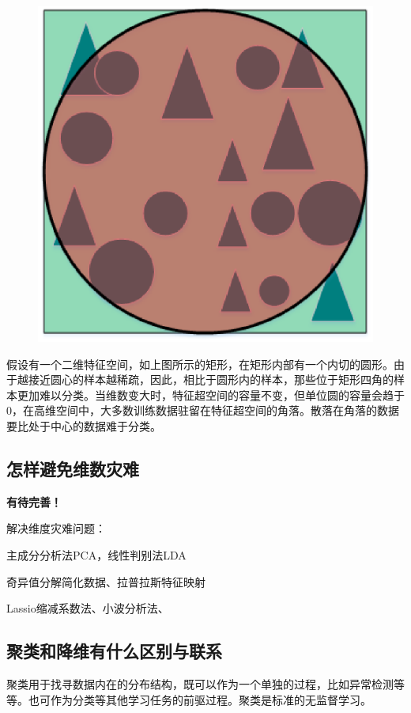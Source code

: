  \begin{figure}[h]
   \centering
   \includegraphics[width=.5\textwidth]{imgs/2.21.1.7.eps}
 \end{figure}

假设有一个二维特征空间，如上图所示的矩形，在矩形内部有一个内切的圆形。由于越接近圆心的样本越稀疏，因此，相比于圆形内的样本，那些位于矩形四角的样本更加难以分类。当维数变大时，特征超空间的容量不变，但单位圆的容量会趋于0，在高维空间中，大多数训练数据驻留在特征超空间的角落。散落在角落的数据要比处于中心的数据难于分类。

\subsection{怎样避免维数灾难}

{\bf 有待完善！}

解决维度灾难问题：

主成分分析法PCA，线性判别法LDA

奇异值分解简化数据、拉普拉斯特征映射

Lassio缩减系数法、小波分析法、

\subsection{聚类和降维有什么区别与联系}

聚类用于找寻数据内在的分布结构，既可以作为一个单独的过程，比如异常检测等等。也可作为分类等其他学习任务的前驱过程。聚类是标准的无监督学习。

